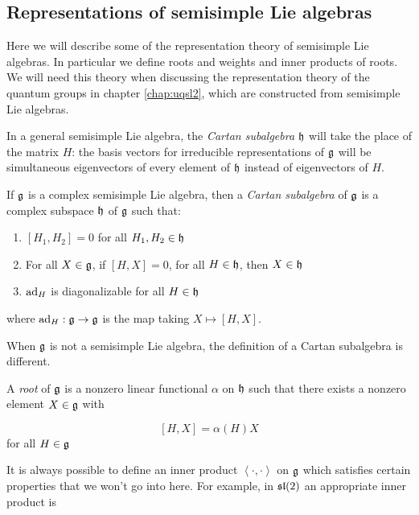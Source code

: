 \subsection{Representations of semisimple Lie algebras}

Here we will describe some of the representation theory of semisimple Lie
algebras. In particular we define roots and weights and inner products of roots.
We will need this theory when discussing the representation theory of the
quantum groups in chapter \ref{chap:uqsl2}, which are constructed from
semisimple Lie algebras. 

In a general semisimple Lie algebra, the \emph{Cartan subalgebra}
$\mathfrak{h}$ will take the place of the matrix $H$: the basis vectors for
irreducible representations of $\mathfrak{g}$ will be simultaneous eigenvectors of
every element of $\mathfrak{h}$ instead of eigenvectors of $H$.

\begin{defn}
    If $\mathfrak{g}$ is a complex semisimple Lie algebra, then a \emph{Cartan
        subalgebra} of $\mathfrak{g}$ is a complex subspace $\mathfrak{h}$ of
        $\mathfrak{g}$ such that: 
    \begin{enumerate}
        \renewcommand{\labelenumi}{\roman{enumi})}
        \item $\left[ H_1, H_2 \right] = 0$ for all $H_1, H_2 \in \mathfrak{h}$
        \item For all $X \in \mathfrak{g}$, if $\left[ H,X \right] = 0$, for all $H
            \in \mathfrak{h}$, then $X \in \mathfrak{h}$
        \item $\operatorname{ad}_H$ is diagonalizable for all $H \in \mathfrak{h}$
    \end{enumerate}
where $\operatorname{ad}_H: \mathfrak{g} \to \mathfrak{g}$ is the map taking $X \mapsto [H,X]$.
\end{defn}

When $\mathfrak{g}$ is not a semisimple Lie algebra, the definition of a Cartan
subalgebra is different.

\begin{defn}
A \emph{root} of $\mathfrak{g}$ is a nonzero linear functional $\alpha$ on $\mathfrak{h}$ such that there exists a nonzero element $X \in \mathfrak{g}$ with 

\begin{equation}
\left[ H,X \right] = \alpha(H)X
\end{equation}
for all $H \in \mathfrak{g}$
\end{defn}

It is always possible to define an inner product $\left<\cdot,\cdot\right>$ on
$\mathfrak{g}$ which satisfies certain properties that we won't go into here. For
example, in $\mathfrak{sl}(2)$ an appropriate inner product is 

